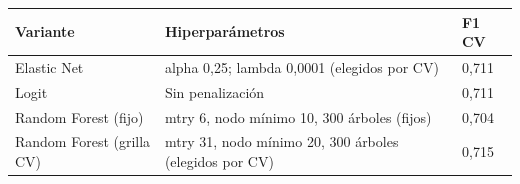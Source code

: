 
\begin{tabular}{lll}
\toprule
Variante & Hiperparámetros & F1 CV\\
\midrule
Elastic Net & alpha 0,25; lambda 0,0001 (elegidos por CV) & 0,711\\
Logit & Sin penalización & 0,711\\
Random Forest (fijo) & mtry 6, nodo mínimo 10, 300 árboles (fijos) & 0,704\\
Random Forest (grilla CV) & mtry 31, nodo mínimo 20, 300 árboles (elegidos por CV) & 0,715\\
\bottomrule
\end{tabular}
